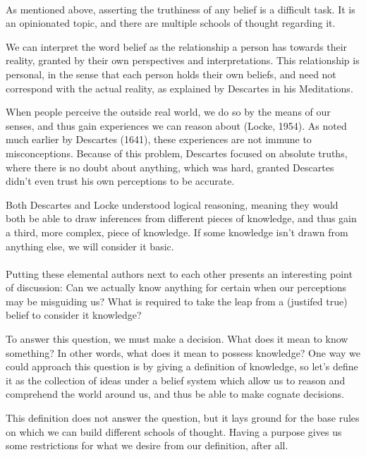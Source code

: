 \documentclass[11pt]{article}
\begin{document}
	\paragraph{} As mentioned above, asserting the truthiness of any belief is a difficult task. It is an opinionated topic, and there are multiple schools of thought regarding it.

	We can interpret the word belief as the relationship a person has towards their reality, granted by their own perspectives and interpretations. This relationship is personal, in the sense that each person holds their own beliefs, and need not correspond with the actual reality, as explained by Descartes in his Meditations.

	When people perceive the outside real world, we do so by the means of our senses, and thus gain experiences we can reason about (Locke, 1954). As noted much earlier by Descartes (1641), these experiences are not immune to misconceptions. Because of this problem, Descartes focused on absolute truths, where there is no doubt about anything, which was hard, granted Descartes didn't even trust his own perceptions to be accurate.

	Both Descartes and Locke understood logical reasoning, meaning they would both be able to draw inferences from different pieces of knowledge, and thus gain a third, more complex, piece of knowledge. If some knowledge isn't drawn from anything else, we will consider it basic.
	
	\paragraph{} Putting these elemental authors next to each other presents an interesting point of discussion: Can we actually know anything for certain when our perceptions may be misguiding us? What is required to take the leap from a (justifed true) belief to consider it knowledge?

	To answer this question, we must make a decision. What does it mean to know something? In other words, what does it mean to possess knowledge? One way we could approach this question is by giving a definition of knowledge, so let's define it as the collection of ideas under a belief system which allow us to reason and comprehend the world around us, and thus be able to make cognate decisions.

	This definition does not answer the question, but it lays ground for the base rules on which we can build different schools of thought. Having a purpose gives us some restrictions for what we desire from our definition, after all.
\end{document}
